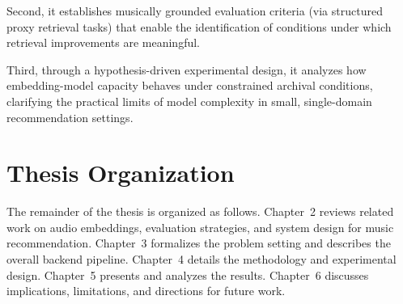 
Second, it establishes musically grounded evaluation criteria (via structured proxy retrieval tasks) that enable the identification of conditions under which retrieval improvements are meaningful.

Third, through a hypothesis-driven experimental design, it analyzes how embedding-model capacity behaves under constrained archival conditions, clarifying the practical limits of model complexity in small, single-domain recommendation settings.


\section{Thesis Organization}

The remainder of the thesis is organized as follows.
Chapter~2 reviews related work on audio embeddings, evaluation strategies, and system design for music recommendation.
Chapter~3 formalizes the problem setting and describes the overall backend pipeline.
Chapter~4 details the methodology and experimental design.
Chapter~5 presents and analyzes the results.
Chapter~6 discusses implications, limitations, and directions for future work.
